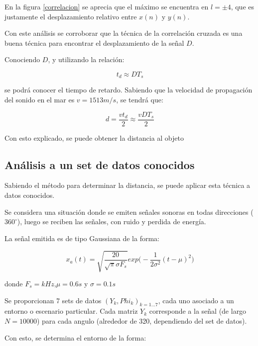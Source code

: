 \documentclass[letterpaper,11pt]{article}
\begin{document}
En la figura \ref{correlacion} se aprecia que el máximo se encuentra en $l = \pm 4$, que es justamente el desplazamiento relativo entre $x(n)$ y $y(n)$.

Con este análisis se corroborar que la técnica de la correlación cruzada es una buena técnica para encontrar el desplazamiento de la señal $D$.\par

Conociendo $D$, y utilizando la relación:

\begin{equation}
t_{d}\approx DT_{s}
\end{equation}

se podrá conocer el tiempo de retardo. Sabiendo que la velocidad de propagación del sonido en el mar es $ v = 1513 m/s$, se tendrá que:

\begin{equation}
d = \frac{vt_{d}}{2} \approx \frac{vDT_{s}}{2}
\end{equation}

Con esto explicado, se puede obtener la distancia al objeto

\subsection{Análisis a un set de datos conocidos}

Sabiendo el método para determinar la distancia, se puede aplicar esta técnica a datos conocidos. \par

Se considera una situación donde se emiten señales sonoras en todas direcciones ($360^{\circ}$), luego se reciben las señales, con ruido y perdida de energía.

La señal emitida es de tipo Gaussiana de la forma:

\begin{equation}
x_{a}(t) = \sqrt{\frac{20}{\sqrt{\pi}\sigma F_{s}}} exp\Bigg( -\frac{1}{2\sigma^2}(t-\mu)^2 \Bigg)
\end{equation}

donde $F_{s} = kHz$,$\mu = 0.6s$ y $\sigma = 0.1s$

Se proporcionan 7 sets de datos $(Y_{k},Phi_{k})_{k=1...7}$, cada uno asociado a un entorno o escenario particular. Cada matriz $Y_{k}$ corresponde a la señal (de largo $N =10000$) para cada angulo (alrededor de 320, dependiendo del set de datos).\par

Con esto, se determina el entorno de la forma:
\end{document}
